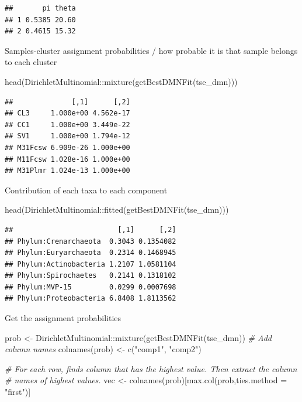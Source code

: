 \documentclass[
]{book}
\newenvironment{Shaded}{\begin{snugshade}}{\end{snugshade}}
\newcommand{\AttributeTok}[1]{\textcolor[rgb]{0.77,0.63,0.00}{#1}}
\newcommand{\CommentTok}[1]{\textcolor[rgb]{0.56,0.35,0.01}{\textit{#1}}}
\newcommand{\FunctionTok}[1]{\textcolor[rgb]{0.00,0.00,0.00}{#1}}
\newcommand{\NormalTok}[1]{#1}
\newcommand{\OtherTok}[1]{\textcolor[rgb]{0.56,0.35,0.01}{#1}}
\newcommand{\SpecialCharTok}[1]{\textcolor[rgb]{0.00,0.00,0.00}{#1}}
\newcommand{\StringTok}[1]{\textcolor[rgb]{0.31,0.60,0.02}{#1}}
\begin{document}
\begin{verbatim}
##       pi theta
## 1 0.5385 20.60
## 2 0.4615 15.32
\end{verbatim}

Samples-cluster assignment probabilities / how probable it is that sample belongs
to each cluster

\begin{Shaded}
\begin{Highlighting}[]
\FunctionTok{head}\NormalTok{(DirichletMultinomial}\SpecialCharTok{::}\FunctionTok{mixture}\NormalTok{(}\FunctionTok{getBestDMNFit}\NormalTok{(tse\_dmn)))}
\end{Highlighting}
\end{Shaded}

\begin{verbatim}
##              [,1]      [,2]
## CL3     1.000e+00 4.562e-17
## CC1     1.000e+00 3.449e-22
## SV1     1.000e+00 1.794e-12
## M31Fcsw 6.909e-26 1.000e+00
## M11Fcsw 1.028e-16 1.000e+00
## M31Plmr 1.024e-13 1.000e+00
\end{verbatim}

Contribution of each taxa to each component

\begin{Shaded}
\begin{Highlighting}[]
\FunctionTok{head}\NormalTok{(DirichletMultinomial}\SpecialCharTok{::}\FunctionTok{fitted}\NormalTok{(}\FunctionTok{getBestDMNFit}\NormalTok{(tse\_dmn)))}
\end{Highlighting}
\end{Shaded}

\begin{verbatim}
##                         [,1]      [,2]
## Phylum:Crenarchaeota  0.3043 0.1354082
## Phylum:Euryarchaeota  0.2314 0.1468945
## Phylum:Actinobacteria 1.2107 1.0581104
## Phylum:Spirochaetes   0.2141 0.1318102
## Phylum:MVP-15         0.0299 0.0007698
## Phylum:Proteobacteria 6.8408 1.8113562
\end{verbatim}

Get the assignment probabilities

\begin{Shaded}
\begin{Highlighting}[]
\NormalTok{prob }\OtherTok{\textless{}{-}}\NormalTok{ DirichletMultinomial}\SpecialCharTok{::}\FunctionTok{mixture}\NormalTok{(}\FunctionTok{getBestDMNFit}\NormalTok{(tse\_dmn))}
\CommentTok{\# Add column names}
\FunctionTok{colnames}\NormalTok{(prob) }\OtherTok{\textless{}{-}} \FunctionTok{c}\NormalTok{(}\StringTok{"comp1"}\NormalTok{, }\StringTok{"comp2"}\NormalTok{)}

\CommentTok{\# For each row, finds column that has the highest value. Then extract the column }
\CommentTok{\# names of highest values.}
\NormalTok{vec }\OtherTok{\textless{}{-}} \FunctionTok{colnames}\NormalTok{(prob)[}\FunctionTok{max.col}\NormalTok{(prob,}\AttributeTok{ties.method =} \StringTok{"first"}\NormalTok{)]}
\end{Highlighting}
\end{Shaded}
\end{document}
